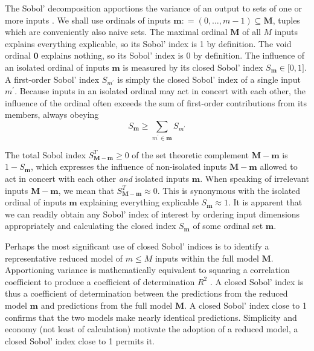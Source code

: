 \documentclass[preprint,12pt]{elsarticle}
\newcommand*{\M}[1]{\ensuremath{#1}\xspace}
\newcommand*{\mi}[1]{\mathbf{#1}}
\newcommand*{\deq}{\M{\mathrel{\mathop:}=}}
\begin{document}
    The Sobol' decomposition apportions the variance of an output to sets of one or more inputs \cite{Sobol2001}. We shall use ordinals of inputs $\mi{m}\deq(0,\ldots ,m-1) \subseteq \mi{M}$, tuples which are conveniently also naive sets. The maximal ordinal $\mi{M}$ of all $M$ inputs explains everything explicable, so its Sobol' index is 1 by definition. The void ordinal $\mi{0}$ explains nothing, so its Sobol' index is 0 by definition. 
    The influence of an isolated ordinal of inputs $\mi{m}$ is measured by its closed Sobol' index $S_{\mi{m}} \in \lbrack 0,1\rbrack$. A first-order Sobol' index $S_{m^{\prime}}$ is simply the closed Sobol' index of a single input $m^{\prime}$.
    Because inputs in an isolated ordinal may act in concert with each other, the influence of the ordinal often exceeds the sum of first-order contributions from its members, always obeying 
    \begin{equation*}
        S_{\mi{m}} \geq \sum_{m^{\prime} \in \mi{m}} S_{m^{\prime}}
    \end{equation*}

    The total Sobol index $S^{T}_{\mi{M-m}} \geq 0$ of the set theoretic complement $\mi{M-m}$ is $1-S_{\mi{m}}$, which expresses the influence of non-isolated inputs $\mi{M-m}$ allowed to act in concert with each other \emph{and} isolated inputs $\mi{m}$. When speaking of irrelevant inputs $\mi{M-m}$, we mean that $S^{T}_{\mi{M-m}} \approx 0$. This is synonymous with the isolated ordinal of inputs $\mi{m}$ explaining everything explicable $S_{\mi{m}}\approx 1$.
    It is apparent that we can readily obtain any Sobol' index of interest by ordering input dimensions appropriately and calculating the closed index $S_{\mi{m}}$ of some ordinal set $\mi{m}$.

    Perhaps the most significant use of closed Sobol' indices is to identify a representative reduced model of $m\leq M$ inputs within the full model $\mi{M}$.
    Apportioning variance is mathematically equivalent to squaring a correlation coefficient to produce a coefficient of determination $R^{2}$ \cite{Chicco2021}. A closed Sobol' index is thus a coefficient of determination between the predictions from the reduced model $\mi{m}$ and predictions from the full model $\mi{M}$. A closed Sobol' index close to 1 confirms that the two models make nearly identical predictions. Simplicity and economy (not least of calculation) motivate the adoption of a reduced model, a closed Sobol' index close to 1 permits it.
\end{document}
